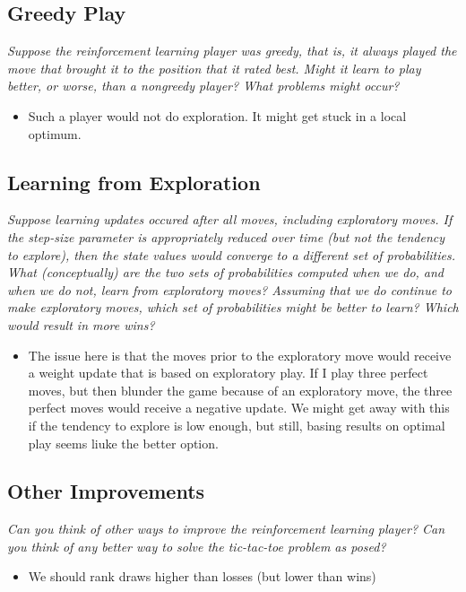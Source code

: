 \documentclass{article}
\begin{document}
\subsection{Greedy Play}
\textit{Suppose the reinforcement learning player was greedy, that is, it always played the move that brought it to the position that it rated best. Might it learn to play better, or worse, than a nongreedy player? What problems might occur?}
\begin{itemize}
\item Such a player would not do exploration. It might get stuck in a local optimum.
\end{itemize}

\subsection{Learning from Exploration}
\textit{Suppose learning updates occured after all moves, including exploratory moves. If the step-size parameter is appropriately reduced over time (but not the tendency to explore), then the state values would converge to a different set of probabilities. What (conceptually) are the two sets of probabilities computed when we do, and when we do not, learn from exploratory moves? Assuming that we do continue to make exploratory moves, which set of probabilities might be better to learn? Which would result in more wins?}
\begin{itemize}
\item The issue here is that the moves prior to the exploratory move would receive a weight update that is based on exploratory play. If I play three perfect moves, but then blunder the game because of an exploratory move, the three perfect moves would receive a negative update. We might get away with this if the tendency to explore is low enough, but still, basing results on optimal play seems liuke the better option.
\end{itemize}
\subsection{Other Improvements}
\textit{Can you think of other ways to improve the reinforcement learning player? Can you think of any better way to solve the tic-tac-toe problem as posed?}
\begin{itemize}
\item We should rank draws higher than losses (but lower than wins)
\end{itemize}
\end{document}
